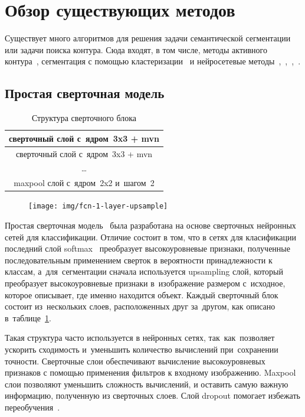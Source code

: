 \section{Обзор существующих методов}

Существует много алгоритмов для решения задачи семантической сегментации или задачи поиска контура. Сюда входят, в том числе, методы активного контура~\cite{snakes}, сегментация с помощью кластеризации~\cite{clustering_segm} и нейросетевые методы~\cite{fcn},~\cite{unet},~\cite{gridnet},~\cite{deeplab}.

\subsection{Простая сверточная модель}

\begin{table}[b]
  \begin{center}
    \caption{Структура сверточного блока} \label{tab:conv_block}
    \begin{tabular}{ c }
      \hline
      сверточный слой с~ядром~3x3 + mvn     \\ \hline
      сверточный слой с~ядром~3x3 + mvn     \\ \hline
      \dots                                 \\ \hline
      maxpool слой с~ядром~2x2 и~шагом~2    \\ 
      \hline
    \end{tabular}
  \end{center}
\end{table}

\begin{figure}[ht]
  \texttt{[image: img/fcn-1-layer-upsample]}
\end{figure}

Простая сверточная модель~\cite{fcn_1_layer_upsample} была разработана на основе сверточных нейронных сетей для классификации. Отличие состоит в том, что в сетях для класификации последний слой softmax~\cite{classification_loss} преобразует высокоуровневые признаки, полученные последовательным применением сверток в вероятности принадлежности к классам, а~для~сегментации сначала используется upsampling слой, который преобразует высокоуровневые признаки в~изображение размером с~исходное, которое описывает, где именно находится объект. Каждый сверточный блок состоит из~нескольких слоев, расположенных друг за~другом, как описано в~таблице~\ref{tab:conv_block}.

Такая структура часто используется в нейронных сетях, так~как~позволяет ускорить сходимость и~уменьшить количество вычислений при~сохранении точности. Сверточные слои обеспечивают вычисление высокоуровневых признаков с помощью применения фильтров к входному изображению. Maxpool слои позволяют уменьшить сложность вычислений, и оставить самую важную информацию, полученную из сверточных слоев. Слой dropout помогает избежать переобучения~\cite{dropout}. 

